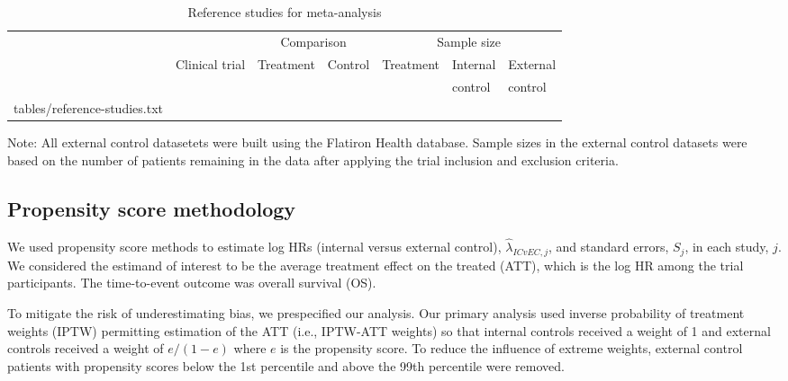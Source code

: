 \documentclass[11pt,final,fleqn]{article}\usepackage[]{graphicx}\usepackage[]{color}
\makeatletter
\newcommand*\ExpandableInput[1]{\@@input#1 }
\makeatother
\begin{document}
\begin{table}
\scriptsize
\begin{center}
\begin{threeparttable}
\caption{Reference studies for meta-analysis} \label{tbl:reference-studies}
\begin{tabular}{llp{4cm}p{4cm}lll}
\hline
\multicolumn{2}{l}{} & \multicolumn{2}{c}{Comparison} & \multicolumn{3}{c}{Sample size} \\
\cmidrule(r){3-4} \cmidrule(r){5-7}
\multicolumn{1}{l}{} & \multicolumn{1}{l}{Clinical trial} & \multicolumn{1}{l}{Treatment} & \multicolumn{1}{l}{Control} & \multicolumn{1}{l}{Treatment} & \multicolumn{1}{l}{Internal}  & \multicolumn{1}{l}{External} \\
\multicolumn{5}{l}{} & \multicolumn{1}{l}{control} &  \multicolumn{1}{l}{control}\\
\hline
\ExpandableInput{tables/reference-studies.txt}
\hline
\end{tabular}
\scriptsize Note: All external control datasetets were built using the Flatiron Health database. Sample sizes in the external control datasets were based on the number of patients remaining in the data after applying the trial inclusion and exclusion criteria.  
\end{threeparttable}
\end{center}
\end{table}

\subsection{Propensity score methodology} \label{subsec:propensity-score}
We used propensity score methods to estimate log HRs (internal versus external control), $\hat{\lambda}_{ICvEC,j}$, and standard errors, $S_j$, in each study, $j$. We considered the estimand of interest to be the average treatment effect on the treated (ATT), which is the log HR among the trial participants. The time-to-event outcome was overall survival (OS).

To mitigate the risk of underestimating bias, we prespecified our analysis. Our primary analysis used inverse probability of treatment weights (IPTW) permitting estimation of the ATT (i.e., IPTW-ATT weights) so that internal controls received a weight of 1 and external controls received a weight of $e/(1-e)$ where $e$ is the propensity score.\cite{austin2015moving} To reduce the influence of extreme weights, external control patients with propensity scores below the 1st percentile and above the 99th percentile were removed. 
\end{document}
